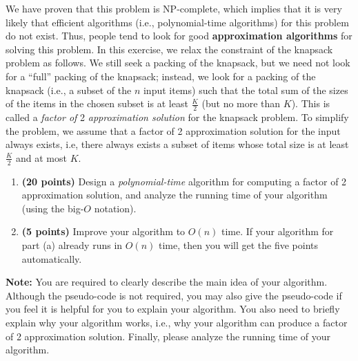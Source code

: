 \documentclass[paper=a4, fontsize=11pt]{scrartcl} %
\numberwithin{equation}{section} %
\numberwithin{figure}{section} %
\numberwithin{table}{section} %
\begin{document}
\begin{enumerate}
We have proven that this problem is NP-complete, which implies that it is very likely that efficient algorithms (i.e., polynomial-time algorithms) for this problem do not exist. Thus, people tend to look for good \textbf{approximation algorithms} for solving this problem. In this exercise, we relax the constraint of the knapsack problem as follows. We still seek a packing of the knapsack, but we need not look for a \enquote{full} packing of the knapsack; instead, we look for a packing of the knapsack (i.e., a subset of the $n$ input items) such that the total sum of the sizes of the items in the chosen subset is at least $\frac{K}{2}$ (but no more than $K$). This is called a \emph{factor of} 2 \emph{approximation solution} for the knapsack problem. To simplify the problem, we assume that a factor of 2 approximation solution for the input always exists, i.e, there always exists a subset of items whose total size is at least $\frac{K}{2}$ and at most $K$.
\begin{enumerate}
\item \textbf{(20 points)} Design a \emph{polynomial-time} algorithm for computing a factor of 2 approximation solution, and analyze the running time of your algorithm (using the big-$O$ notation).
\item \textbf{(5 points)} Improve your algorithm to $O(n)$ time. If your algorithm for part (a) already runs in $O(n)$ time, then you will get the five points automatically.
\end{enumerate}
\textbf{Note:} You are required to clearly describe the main idea of your algorithm. Although the pseudo-code is not required, you may also give the pseudo-code if you feel it is helpful for you to explain your algorithm. You also need to briefly explain why your algorithm works, i.e., why your algorithm can produce a factor of 2 approximation solution. Finally, please analyze the running time of your algorithm.

\end{enumerate}

\end{document}
